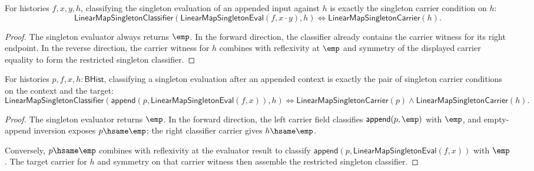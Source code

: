 \begin{theorem}
\label{thm:linearmap-singleton-eval-append-input-classifier}
For histories $f,x,y,h$, classifying the singleton evaluation of an appended
input against $h$ is exactly the singleton carrier condition on $h$:
$$
\mathsf{LinearMapSingletonClassifier}
  (\mathsf{LinearMapSingletonEval}(f,x\cdot y),h)
\Longleftrightarrow
\mathsf{LinearMapSingletonCarrier}(h).
$$
\end{theorem}
\begin{proof}
The singleton evaluator always returns $\emp$. In the forward direction, the
classifier already contains the carrier witness for its right endpoint. In the
reverse direction, the carrier witness for $h$ combines with reflexivity at
$\emp$ and symmetry of the displayed carrier equality to form the restricted
singleton classifier.
\end{proof}

\begin{theorem}
\label{thm:linearmap-singleton-eval-append-context-classifier}
For histories $p,f,x,h:\mathsf{BHist}$, classifying a singleton evaluation
after an appended context is exactly the pair of singleton carrier conditions
on the context and the target:
$$
\mathsf{LinearMapSingletonClassifier}
  (\mathsf{append}(p,\mathsf{LinearMapSingletonEval}(f,x)),h)
\Longleftrightarrow
\mathsf{LinearMapSingletonCarrier}(p)\land
\mathsf{LinearMapSingletonCarrier}(h).
$$
\end{theorem}
\begin{proof}
The singleton evaluator returns $\emp$. In the forward direction, the left
carrier field classifies $\mathsf{append}(p,\emp)$ with $\emp$, and
empty-append inversion exposes $p\hsame\emp$; the right classifier carrier
gives $h\hsame\emp$.

Conversely, $p\hsame\emp$ combines with reflexivity at the evaluator result to
classify $\mathsf{append}(p,\mathsf{LinearMapSingletonEval}(f,x))$ with
$\emp$. The target carrier for $h$ and symmetry on that carrier witness then
assemble the restricted singleton classifier.
\end{proof}

